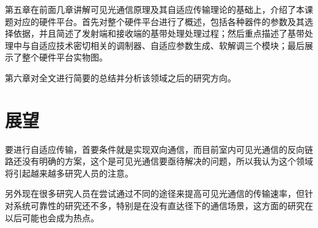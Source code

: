 第五章在前面几章讲解可见光通信原理及其自适应传输理论的基础上，介绍了本课题对应的硬件平台。首先对整个硬件平台进行了概述，包括各种器件的参数及其选择依据，并且简述了发射端和接收端的基带处理处理过程；然后重点描述了基带处理中与自适应技术密切相关的调制器、自适应参数生成、软解调三个模块；最后展示了整个硬件平台实物图。

第六章对全文进行简要的总结并分析该领域之后的研究方向。
\section{展望}
要进行自适应传输，首要条件就是实现双向通信，而目前室内可见光通信的反向链路还没有明确的方案，这个是可见光通信要亟待解决的问题，所以我认为这个领域将引起越来越多研究人员的注意。

另外现在很多研究人员在尝试通过不同的途径来提高可见光通信的传输速率，但针对系统可靠性的研究还不多，特别是在没有直达径下的通信场景，这方面的研究在以后可能也会成为热点。